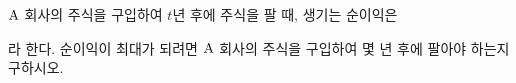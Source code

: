 $\mathrm{A}$ 회사의 주식을 구입하여 $t$년 후에 주식을 팔 때, 생기는 순이익은 \par\smallskip{}\par\smallskip\noindent 라 한다. 순이익이 최대가 되려면 $\mathrm{A}$ 회사의 주식을 구입하여 몇 년 후에 팔아야 하는지 구하시오. 
